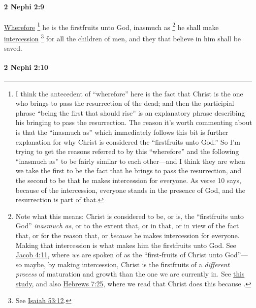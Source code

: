 		\paragraph{2 Nephi 2:9} %
			\label{2NEPHI-2-9}
			
			\hyperref[WHEREFORE-1828]{Wherefore}%
				\footnote{%
					\label{2NEPHI-2-9-wherefore}%
					I think the antecedent of ``wherefore'' here is the fact that Christ is the one who brings to pass the resurrection of the dead; and then the participial phrase ``being the first that should rise'' is an explanatory phrase describing his bringing to pass the resurrection. The reason it's worth commenting about is that the ``inasmuch as'' which immediately follows this bit is further explanation for why Christ is considered the ``firstfruits unto God.'' So I'm trying to get the reasons referred to by this ``wherefore'' and the following ``inasmuch as'' to be fairly similar to each other---and I think they are when we take the first to be the fact that he brings to pass the resurrection, and the second to be that he makes intercession for everyone. As verse 10 says, because of the intercession, everyone stands in the presence of God, and the resurrection is part of that.
					}
			he is the firstfruits unto God,
			inasmuch as%
				\footnote{%
					\label{2NEPHI-2-9-inasmuch}%
					Note what this means: Christ is considered to be, or is, the ``firstfruits unto God'' \textit{inasmuch as}, or to the extent that, or in that, or in view of the fact that, or for the reason that, or \textit{because} he makes intercession for everyone. Making that intercession is what makes him the firstfruits unto God. See \hyperref[JACOB-4-11]{Jacob 4:11}, where \textit{we} are spoken of as the ``first-fruits of Christ unto God''---so maybe, by making intercession, Christ is the firstfruits of a \textit{different process} of maturation and growth than the one we are currently in. See \hyperref[FIRSTFRUITS-UNTOGOD]{this study}, and also \hyperref[HEBREWS-7-25]{Hebrews 7:25}, where we read that Christ does this because .
					}
			he shall make \hyperref[INTERCESSION-1828]{intercession}%
				\footnote{%
					\label{2NEPHI-2-9-intercession}%
					See \hyperref[ISAIAH-53-12]{Isaiah 53:12}.
					}
			for all the children of men,
			and they that believe in him shall be saved.
			
		\paragraph{2 Nephi 2:10} %
			\label{2NEPHI-2-10}
			
